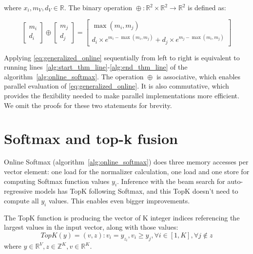\documentclass{article}
\DeclareMathOperator{\normRed}{\oplus}
\begin{document}
where \(x_i, m_V, d_V \in \mathbb{R}\). The binary operation $\normRed:\mathbb{R}^2\times \mathbb{R}^2\rightarrow\mathbb{R}^2$ is defined as:

\begin{equation}
\begin{bmatrix}m_i\\d_i\end{bmatrix}\normRed\begin{bmatrix}m_j\\d_j\end{bmatrix} = \begin{bmatrix}\max\left(m_i,m_j\right)\\d_i\times e^{m_i-\max\left(m_i,m_j\right)}+d_j\times e^{m_j-\max\left(m_i,m_j\right)}\end{bmatrix}
\end{equation}

Applying \eqref{eq:generalized_online} sequentially from left to right is equivalent to running lines~\ref{alg:start_thm_line}-\ref{alg:end_thm_line} of the algorithm~\ref{alg:online_softmax}. The operation $\normRed$ is associative, which enables parallel evaluation of \eqref{eq:generalized_online}. It is also commutative, which provides the flexibility needed to make parallel implementations more efficient. We omit the proofs for these two statements for brevity.

\section{Softmax and top-k fusion}

Online Softmax (algorithm~\ref{alg:online_softmax}) does three memory accesses per vector element: one load for the normalizer calculation, one load and one store for computing Softmax function values $y_i$. Inference with the beam search for auto-regressive models has TopK following Softmax, and this TopK doesn't need to compute all $y_i$ values. This enables even bigger improvements.

The TopK function is producing the vector of K integer indices referencing the largest values in the input vector, along with those values:
\begin{equation}
TopK\left(y\right)=(v,z): v_i=y_{z_i}, v_i\geq y_j, \forall i \in \left[1,K\right], \forall j \notin z
\end{equation}
where \(y \in \mathbb{R}^V, z \in \mathbb{Z}^K, v\in \mathbb{R}^K\).
\end{document}
